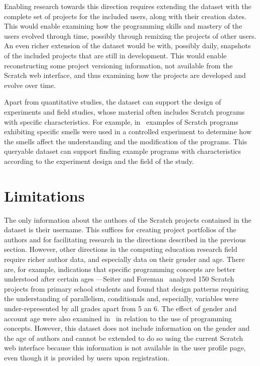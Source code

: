 \documentclass[10pt, conference]{IEEEtran}
\begin{document}
Enabling research towards this direction requires extending the dataset with the complete set of projects for the included users, along with their creation dates.
This would enable examining how the programming skills and mastery of the users evolved through time, possibly through remixing the projects of other users.
An even richer extension of the dataset would be with, possibly daily, snapshots of the included projects that are still in development.
This would enable reconstructing some project versioning information, not available from the Scratch web interface, and thus examining how the projects are developed and evolve over time.

Apart from quantitative studies, the dataset can support the design of experiments and field studies, whose material often includes Scratch programs with specific characteristics.
For example, in~\cite{hermans_2016} examples of Scratch programs exhibiting specific smells were used in a controlled experiment to determine how the smells affect the understanding and the modification of the programs.
This queryable dataset can support finding example programs with characteristics according to the experiment design and the field of the study.

\section{Limitations}
The only information about the authors of the Scratch projects contained in the dataset is their username.
This suffices for creating project portfolios of the authors and for facilitating research in the directions described in the previous section.
However, other directions in the computing education research field require richer author data, and especially data on their gender and age.
There are, for example, indications that specific programming concepts are better understood after certain ages ---Seiter and Foreman~\cite{Seiter_2013} analyzed 150 Scratch projects from primary school students and found that design patterns requiring the understanding of parallelism, conditionals and, especially, variables were under-represented by all grades apart from 5 an 6.
The effect of gender and account age were also examined in~\cite{fields_2014} in relation to the use of programming concepts.
However, this dataset does not include information on the gender and the age of authors and cannot be extended to do so using the current Scratch web interface because this information is not available in the user profile page\footnotemark[\ref{fn-authorpage}], even though it is provided by users upon registration.
\end{document}

